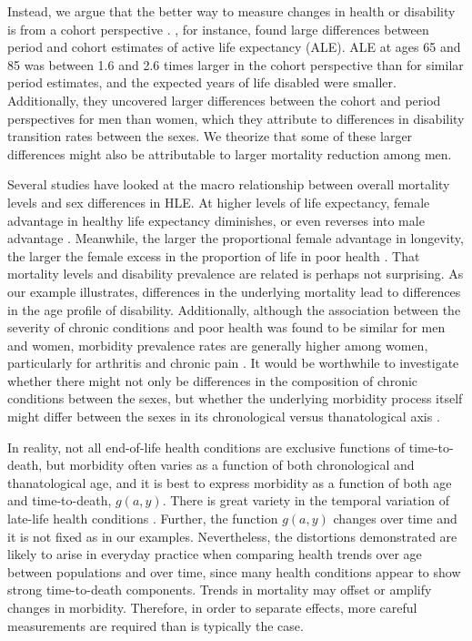 \documentclass[11pt,oneside,a4paper]{article} %
\begin{document}
Instead, we argue that the better way to measure changes in health or disability is from a cohort perspective \citep{Manton2000,Manton2008,Christensen2013}. \citet{Manton2000}, for instance, found large differences between period and cohort estimates of active life expectancy (ALE). ALE at ages 65 and 85 was between 1.6 and 2.6 times larger in the cohort perspective than for similar period estimates, and the expected years of life disabled were smaller. Additionally, they uncovered larger differences between the cohort and period perspectives for men than women, which they attribute to differences in disability transition rates between the sexes. We theorize that some of these larger differences might also be attributable to larger mortality reduction among men.

Several studies have looked at the macro relationship between overall mortality levels and sex differences in HLE. At higher levels of life expectancy, female advantage in healthy life expectancy diminishes, or even reverses into male advantage \citep{vanOyen2013}. Meanwhile, the larger the proportional female advantage in longevity, the larger the female excess in the proportion of life in poor health \citep{Luy2014}. That mortality levels and disability prevalence are related is perhaps not surprising. As our example illustrates, differences in the underlying mortality lead to differences in the age profile of disability. Additionally, although the association between the severity of chronic conditions and poor health was found to be similar for men and women, morbidity prevalence rates are generally higher among women, particularly for arthritis and chronic pain \citep{Case2005}. It would be worthwhile to investigate whether there might not only be differences in the composition of chronic conditions between the sexes, but whether the underlying morbidity process itself might differ between the sexes in its chronological versus thanatological axis \citep{Riffe2015}. 

In reality, not all end-of-life health conditions are exclusive functions of
time-to-death, but morbidity often varies as a function of
both chronological and thanatological age, and it is best to express morbidity
as a function of both age and time-to-death, $g(a,y)$. There is great variety in
the temporal variation of late-life health conditions \citep{Riffe2015}.
Further, the function $g(a,y)$ changes over time and it is not fixed as in our examples. Nevertheless, the distortions demonstrated are likely to arise in everyday practice when comparing health trends over age between populations
and over time, since many health conditions appear to show strong time-to-death
components. Trends in mortality may offset or amplify changes in morbidity.
Therefore, in order to separate effects, more careful measurements are required
than is typically the case. 
\end{document}
